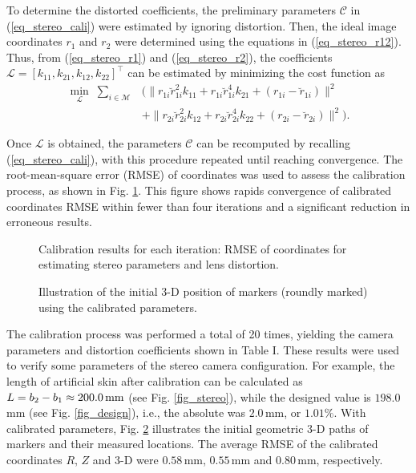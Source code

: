 \documentclass[10pt,letterpaper,journal,final,twoside,twocolumn,nofonttune]{IEEEtran}
\begin{document}
To determine the distorted coefficients, the preliminary parameters $\bm{\mathcal{C}}$ in (\ref{eq_stereo_cali}) were estimated by ignoring distortion. Then, the ideal image coordinates $r_1$ and $r_2$ were determined using the equations in (\ref{eq_stereo_r12}). Thus, from (\ref{eq_stereo_r1}) and (\ref{eq_stereo_r2}), the coefficients $\bm{\mathcal{L}}=[k_{11},k_{21},k_{12},k_{22}]^{\top}$ can be estimated by minimizing the cost function as
\begin{equation}
\begin{aligned}
\label{eq_stereo_dis}
\min_{\bm{\mathcal{L}}} \;\sum_{i\in \mathcal{M}}&(\lVert r_{1i}\breve{r}_{1i}^2k_{11} + r_{1i}\breve{r}_{1i}^4k_{21} +(r_{1i}- \breve{r}_{1i}) \rVert^2 \\&+\lVert r_{2i}\breve{r}_{2i}^2k_{12} + r_{2i}\breve{r}_{2i}^4k_{22} +(r_{2i}- \breve{r}_{2i}) \rVert^2).
\end{aligned}
\end{equation}%

Once $\bm{\mathcal{L}}$ is obtained, the parameters $\bm{\mathcal{C}}$ can be recomputed by recalling (\ref{eq_stereo_cali}), with this procedure repeated until reaching convergence. The root-mean-square error (RMSE) of coordinates was used to assess the calibration process, as shown in Fig. \ref{fig_iteration}. This figure shows rapids convergence of calibrated coordinates RMSE within fewer than four iterations and a significant reduction in erroneous results. 
\begin{figure}[!t]
\def\svgwidth{\columnwidth}

\caption{Calibration results for each iteration: RMSE of  coordinates for estimating stereo parameters and lens distortion.}
\label{fig_iteration}
\end{figure}
\begin{figure}[!t]
\def\svgwidth{\columnwidth}

\caption{Illustration of the initial 3-D position of markers (roundly marked) using the calibrated parameters.}
\label{fig_calib3D}
\end{figure}
The calibration process was performed a total of 20 times, yielding the camera parameters and distortion coefficients shown in Table I. These results were used to verify some parameters of the stereo camera configuration. For example, the length of artificial skin after calibration can be calculated as $L=b_2-b_1 \approx \text{200.0\,mm}$ (see Fig. \ref{fig_stereo}), while the designed value is $198.0$\,mm (see Fig. \ref{fig_design}), i.e., the absolute was $2.0$\,mm, or $1.01\%$. With calibrated parameters, Fig. \ref{fig_calib3D} illustrates the initial geometric 3-D paths of markers and their measured locations. The average RMSE of the calibrated coordinates $R$, $Z$ and 3-D were $0.58\,\text{mm}$, $0.55\,\text{mm}$ and $0.80\,\text{mm}$, respectively.
\end{document}
